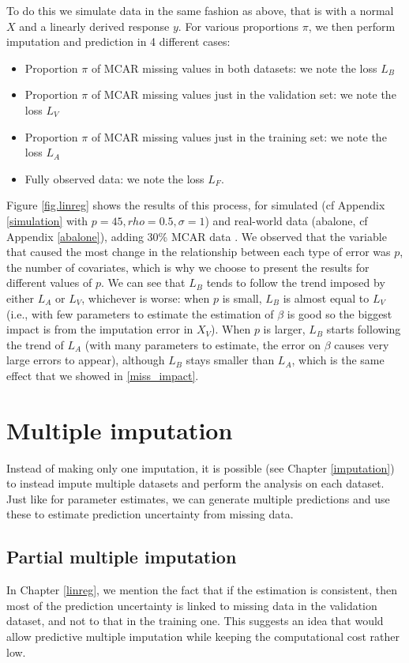 To do this we simulate data in the same fashion as above, that is with a normal $X$ and a linearly derived response $y$. For various proportions $\pi$, we then perform imputation and prediction in 4 different cases:
\begin{itemize}
\item Proportion $\pi$ of MCAR missing values in both datasets: we note the loss $L_B$
\item Proportion $\pi$ of MCAR missing values just in the validation set: we note the loss $L_V$
\item Proportion $\pi$ of MCAR missing values just in the training set: we note the loss $L_A$
\item Fully observed data: we note the loss $L_F$.
\end{itemize}

Figure \ref{fig.linreg} shows the results of this process, for simulated (cf Appendix \ref{simulation} with $p=45, rho=0.5, \sigma=1$) and real-world data (abalone, cf Appendix \ref{abalone}), adding 30\% MCAR data . We observed that the variable that caused the most change in the relationship between each type of error was $p$, the number of covariates, which is why we choose to present the results for different values of $p$. We can see that $L_B$ tends to follow the trend imposed by either $L_A$ or $L_V$, whichever is worse: when $p$ is small, $L_B$ is almost equal to $L_V$ (i.e., with few parameters to estimate the estimation of $\beta$ is good so the biggest impact is from the imputation error in $X_V$). When $p$ is larger, $L_B$ starts following the trend of $L_A$ (with many parameters to estimate, the error on $\beta$ causes very large errors to appear), although $L_B$ stays smaller than $L_A$, which is the same effect that we showed in \ref{miss_impact}.




	\section{Multiple imputation}
Instead of making only one imputation, it is possible (see Chapter \ref{imputation}) to instead impute multiple datasets and perform the analysis on each dataset. Just like for parameter estimates, we can generate multiple predictions and use these to estimate prediction uncertainty from missing data.

		\subsection{Partial multiple imputation}
		In Chapter \ref{linreg}, we mention the fact that if the estimation is consistent, then most of the prediction uncertainty is linked to missing data in the validation dataset, and not to that in the training one. This suggests an idea that would allow predictive multiple imputation while keeping the computational cost rather low.
		
